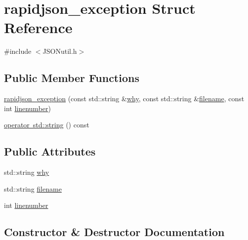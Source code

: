 \hypertarget{structrapidjson__exception}{}\section{rapidjson\+\_\+exception Struct Reference}
\label{structrapidjson__exception}


{\ttfamily \#include $<$J\+S\+O\+Nutil.\+h$>$}

\subsection*{Public Member Functions}
\begin{DoxyCompactItemize}
\item 
\mbox{\hyperlink{structrapidjson__exception_ac81e815ea43f0364ebc365ad299584b9}{rapidjson\+\_\+exception}} (const std\+::string \&\mbox{\hyperlink{structrapidjson__exception_a6b432b89bd7052332bc923f274249e1e}{why}}, const std\+::string \&\mbox{\hyperlink{structrapidjson__exception_a56bc0e220fc6c7037e877f9f2e3f99f0}{filename}}, const int \mbox{\hyperlink{structrapidjson__exception_a9c0263f853d8a17911e29cae66708e67}{linenumber}})
\item 
\mbox{\hyperlink{structrapidjson__exception_afd42d8ce38804d2951ab8cd328cbd9e1}{operator std\+::string}} () const
\end{DoxyCompactItemize}
\subsection*{Public Attributes}
\begin{DoxyCompactItemize}
\item 
std\+::string \mbox{\hyperlink{structrapidjson__exception_a6b432b89bd7052332bc923f274249e1e}{why}}
\item 
std\+::string \mbox{\hyperlink{structrapidjson__exception_a56bc0e220fc6c7037e877f9f2e3f99f0}{filename}}
\item 
int \mbox{\hyperlink{structrapidjson__exception_a9c0263f853d8a17911e29cae66708e67}{linenumber}}
\end{DoxyCompactItemize}


\subsection{Constructor \& Destructor Documentation}
\mbox{\label{structrapidjson__exception_ac81e815ea43f0364ebc365ad299584b9}} 
